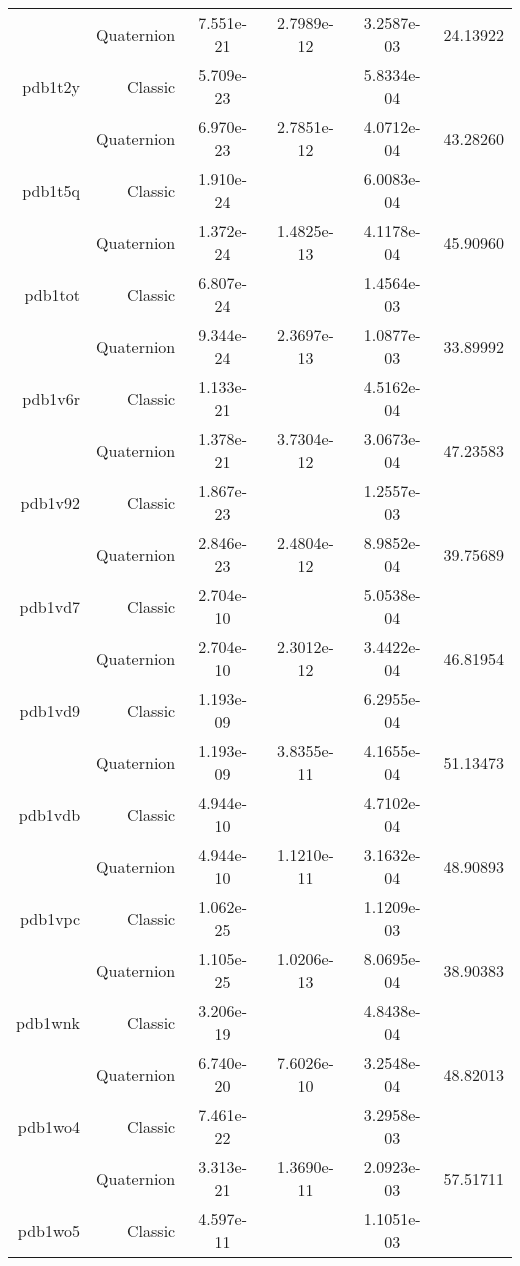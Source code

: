 \begin{xltabular}{\textwidth}{r|rS[table-format=1.3e+2]S[table-format=1.4e+2]S[table-format=1.4e+2]S[table-format=-1.5]}
& Quaternion & 7.551e-21 & 2.7989e-12 & 3.2587e-03 & 24.13922\\  \addlinespace
pdb1t2y & Classic & 5.709e-23 &  & 5.8334e-04 & \\
& Quaternion & 6.970e-23 & 2.7851e-12 & 4.0712e-04 & 43.28260\\  \addlinespace
pdb1t5q & Classic & 1.910e-24 &  & 6.0083e-04 & \\
& Quaternion & 1.372e-24 & 1.4825e-13 & 4.1178e-04 & 45.90960\\  \addlinespace
pdb1tot & Classic & 6.807e-24 &  & 1.4564e-03 & \\
& Quaternion & 9.344e-24 & 2.3697e-13 & 1.0877e-03 & 33.89992\\  \addlinespace
pdb1v6r & Classic & 1.133e-21 &  & 4.5162e-04 & \\
& Quaternion & 1.378e-21 & 3.7304e-12 & 3.0673e-04 & 47.23583\\  \addlinespace
pdb1v92 & Classic & 1.867e-23 &  & 1.2557e-03 & \\
& Quaternion & 2.846e-23 & 2.4804e-12 & 8.9852e-04 & 39.75689\\  \addlinespace
pdb1vd7 & Classic & 2.704e-10 &  & 5.0538e-04 & \\
& Quaternion & 2.704e-10 & 2.3012e-12 & 3.4422e-04 & 46.81954\\  \addlinespace
pdb1vd9 & Classic & 1.193e-09 &  & 6.2955e-04 & \\
& Quaternion & 1.193e-09 & 3.8355e-11 & 4.1655e-04 & 51.13473\\  \addlinespace
pdb1vdb & Classic & 4.944e-10 &  & 4.7102e-04 & \\
& Quaternion & 4.944e-10 & 1.1210e-11 & 3.1632e-04 & 48.90893\\  \addlinespace
pdb1vpc & Classic & 1.062e-25 &  & 1.1209e-03 & \\
& Quaternion & 1.105e-25 & 1.0206e-13 & 8.0695e-04 & 38.90383\\  \addlinespace
pdb1wnk & Classic & 3.206e-19 &  & 4.8438e-04 & \\
& Quaternion & 6.740e-20 & 7.6026e-10 & 3.2548e-04 & 48.82013\\  \addlinespace
pdb1wo4 & Classic & 7.461e-22 &  & 3.2958e-03 & \\
& Quaternion & 3.313e-21 & 1.3690e-11 & 2.0923e-03 & 57.51711\\  \addlinespace
pdb1wo5 & Classic & 4.597e-11 &  & 1.1051e-03 & \\

\end{xltabular}
